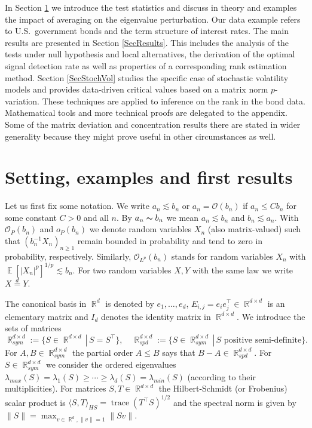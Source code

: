 \documentclass[preprint,aos]{imsart}
\numberwithin{equation}{section}
\theoremstyle{remark}
\DeclareMathOperator{\E}{{\mathbb E}}
\DeclareMathOperator{\R}{{\mathbb R}}
\DeclareMathOperator{\trace}{trace}
\providecommand{\abs}[1]{\lvert #1 \rvert}
\providecommand{\norm}[1]{\lVert #1 \rVert}
\providecommand{\scapro}[2]{\langle #1,#2 \rangle}
\renewcommand{\le}{\leqslant}
\renewcommand{\ge}{\geqslant}
\begin{document}
In Section \ref{SecSetting} we introduce the test statistics and discuss in theory and examples the impact of averaging on the eigenvalue perturbation. Our data example refers to U.S.\ government bonds and the term structure of interest rates.
The main results  are presented in Section \ref{SecResults}. This includes the analysis of the tests under null hypothesis and local alternatives, the derivation of the optimal signal detection rate as well as properties of a corresponding rank estimation method. Section \ref{SecStochVol} studies the specific case of stochastic volatility models and  provides data-driven critical values based on a matrix norm $p$-variation. These techniques are applied to inference on the rank in the bond data. Mathematical tools and more technical proofs are delegated to the appendix. Some of the matrix deviation and concentration results there are stated in wider generality
because they might prove useful in other circumstances as well.


\section{\bf Setting, examples and first results} \label{SecSetting}

Let us first fix some notation. We write $a_n\lesssim b_n$ or $a_n={\mathcal O}(b_n)$ if $a_n\le Cb_n$ for some constant $C>0$ and all $n$. By $a_n\thicksim b_n$ we mean  $a_n\lesssim b_n$ and $b_n\lesssim a_n$.  With ${\mathcal O}_P(b_n)$ and ${o}_P(b_n)$ we denote random variables $X_n$ (also matrix-valued) such that $(b_n^{-1}X_n)_{n\ge 1}$ remain bounded in probability and tend to zero in probability, respectively. Similarly, ${\mathcal O}_{L^p}(b_n)$ stands for random variables $X_n$ with $\E[\abs{X_n}^p]^{1/p}\lesssim b_n$.  For two random variables $X,Y$ with the same law we write $X\stackrel{d}{=}Y$.

The canonical basis in $\R^d$ is denoted by $e_1,\ldots,e_d$, $E_{i,j}=e_ie_j^\top\in\R^{d\times d}$ is an elementary matrix and $I_d$ denotes the identity matrix in $\R^{d\times d}$.
We introduce the sets of  matrices
\[\R^{d\times d}_{sym}:=\{S\in\R^{d\times d}\,|\, S=S^\top\},\quad \R^{d\times d}_{spd}:=\{S\in\R_{sym}^{d\times d}\,|\, S\text{ positive semi-definite}\}.\] For $A,B\in\R_{sym}^{d\times d}$ the partial order $A\le B$ says that $B-A\in \R_{spd}^{d\times d}$.  For $S\in\R_{sym}^{d\times d}$ we consider the ordered eigenvalues $\lambda_{max}(S)=\lambda_1(S)\ge\cdots\ge\lambda_d(S)=\lambda_{min}(S)$ (according to their multiplicities). For matrices $S,T\in\R^{d\times d}$ the Hilbert-Schmidt (or Frobenius) scalar product is $\scapro{S}{T}_{HS}=\trace(T^\top S)^{1/2}$   and the spectral norm is given by $\norm{S}=\max_{v\in\R^d,\norm{v}=1}\norm{Sv}$.
\end{document}
